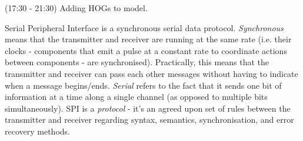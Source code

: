 \documentclass[idxtotoc,hyperref,openany]{labbook} %
\begin{document}
(17:30 - 21:30) Adding HOGs to model.



Serial Peripheral Interface is a synchronous serial data protocol. \emph{Synchronous} means that the transmitter and receiver are running at the same rate (i.e. their clocks - components that emit a pulse at a constant rate to coordinate actions between components - are synchronised). Practically, this means that the transmitter and receiver can pass each other messages without having to indicate when a message begins/ends. \emph{Serial} refers to the fact that it sends one bit of information at a time along a single channel (as opposed to multiple bits simultaneously). SPI is a \emph{protocol} - it's an agreed upon set of rules between the transmitter and receiver regarding syntax, semantics, synchronisation, and error recovery methods.
\end{document}
